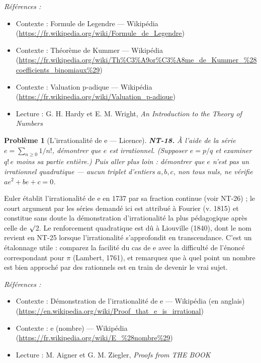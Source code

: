 \documentclass[11pt]{article}
\newtheorem{problem}{Problème}
\newenvironment{refs}{\par\small\noindent\emph{Références :}\begin{itemize}\setlength\itemsep{0pt}}{\end{itemize}\normalsize}
\begin{document}
\begin{refs}
\item Contexte : Formule de Legendre --- Wikipédia (\url{https://fr.wikipedia.org/wiki/Formule_de_Legendre})
\item Contexte : Théorème de Kummer --- Wikipédia (\url{https://fr.wikipedia.org/wiki/Th%C3%A9or%C3%A8me_de_Kummer_%28coefficients_binomiaux%29})
\item Contexte : Valuation p-adique --- Wikipédia (\url{https://fr.wikipedia.org/wiki/Valuation_p-adique})
\item Lecture : G. H. Hardy et E. M. Wright, \textit{An Introduction to the Theory of Numbers}
\end{refs}

\bigskip

\begin{problem}[{L'irrationalité de e --- Licence}]
\textbf{NT-18.} À l'aide de la série $e = \sum_{n \ge 0} 1/n!$,
démontrer que $e$ est irrationnel. (Supposer $e = p/q$ et examiner $q!\,e$ moins sa partie
entière.) Puis aller plus loin : démontrer que $e$ n'est pas un irrationnel quadratique --- aucun
triplet d'entiers $a, b, c$, non tous nuls, ne vérifie $ae^2 + be + c = 0$.
\end{problem}

\noindent Euler établit l'irrationalité de e en 1737 par sa fraction continue (voir
NT-26) ; le court argument par les séries demandé ici est attribué à Fourier (v. 1815) et constitue
sans doute la démonstration d'irrationalité la plus pédagogique après celle de $\surd$2. Le renforcement
quadratique est dû à Liouville (1840), dont le nom revient en NT-25 lorsque l'irrationalité
s'approfondit en transcendance. C'est un étalonnage utile : comparez la facilité du cas de e avec la
difficulté de l'énoncé correspondant pour $\pi$ (Lambert, 1761), et remarquez que \og{} à quel point un
nombre est bien approché par des rationnels \fg{} est en train de devenir le vrai sujet.

\begin{refs}
\item Contexte : Démonstration de l'irrationalité de e --- Wikipédia (en anglais) (\url{https://en.wikipedia.org/wiki/Proof_that_e_is_irrational})
\item Contexte : e (nombre) --- Wikipédia (\url{https://fr.wikipedia.org/wiki/E_%28nombre%29})
\item Lecture : M. Aigner et G. M. Ziegler, \textit{Proofs from THE BOOK}
\end{refs}
\end{document}
